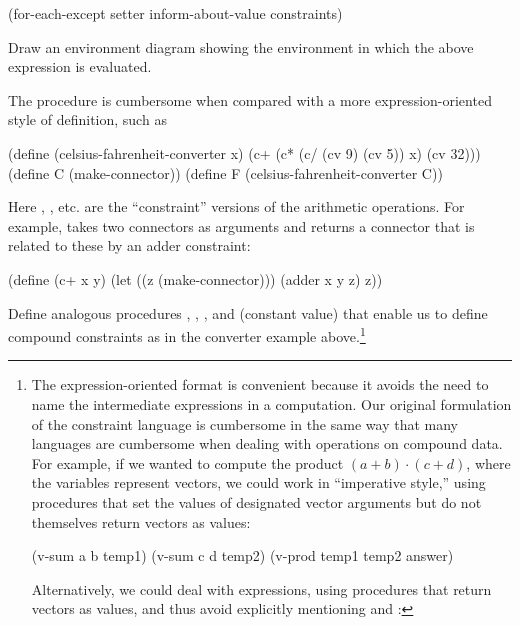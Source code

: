 \begin{exerciseGroup}
\begin{codeBlock}
(for-each-except
  setter inform-about-value constraints)
\end{codeBlock}

Draw an environment diagram showing the environment in which the above
expression is evaluated.

\label{Exercise 3.37}
 The
 procedure is cumbersome when compared with
a more expression-oriented style of definition, such as

\begin{codeBlock}
(define (celsius-fahrenheit-converter x)
  (c+ (c* (c/ (cv 9) (cv 5))
          x)
      (cv 32)))
(define C (make-connector))
(define F (celsius-fahrenheit-converter C))
\end{codeBlock}

Here , , etc. are the ``constraint'' versions of the
arithmetic operations.  For example,  takes two connectors as
arguments and returns a connector that is related to these by an adder
constraint:

\begin{codeBlock}
(define (c+ x y)
  (let ((z (make-connector)))
    (adder x y z)
    z))
\end{codeBlock}

Define analogous procedures , , , and 
(constant value) that enable us to define compound constraints as in the
converter example above.\footnote{%
The expression-oriented format is convenient
because it avoids the need to name the intermediate expressions in a
computation.  Our original formulation of the constraint language is cumbersome
in the same way that many languages are cumbersome when dealing with operations
on compound data.  For example, if we wanted to compute the product
\( (a + b) \cdot (c + d) \), where the variables represent vectors, we could work
in ``imperative style,'' using procedures that set the values of designated
vector arguments but do not themselves return vectors as values:

\begin{compactCodeBlock}
(v-sum a b temp1)
(v-sum c d temp2)
(v-prod temp1 temp2 answer)
\end{compactCodeBlock}

Alternatively, we could deal with expressions, using procedures that return
vectors as values, and thus avoid explicitly mentioning  and
:

}
\end{exerciseGroup}
